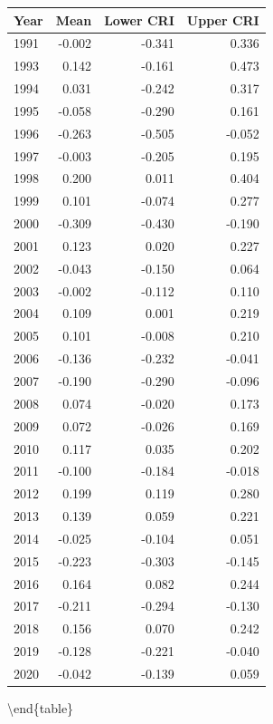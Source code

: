 \documentclass[]{book}
\begin{document}
\begin{tabular}[t]{l|r|r|r}
\hline
Year & Mean & Lower CRI & Upper CRI\\
\hline
1991 & -0.002 & -0.341 & 0.336\\
\hline
1993 & 0.142 & -0.161 & 0.473\\
\hline
1994 & 0.031 & -0.242 & 0.317\\
\hline
1995 & -0.058 & -0.290 & 0.161\\
\hline
1996 & -0.263 & -0.505 & -0.052\\
\hline
1997 & -0.003 & -0.205 & 0.195\\
\hline
1998 & 0.200 & 0.011 & 0.404\\
\hline
1999 & 0.101 & -0.074 & 0.277\\
\hline
2000 & -0.309 & -0.430 & -0.190\\
\hline
2001 & 0.123 & 0.020 & 0.227\\
\hline
2002 & -0.043 & -0.150 & 0.064\\
\hline
2003 & -0.002 & -0.112 & 0.110\\
\hline
2004 & 0.109 & 0.001 & 0.219\\
\hline
2005 & 0.101 & -0.008 & 0.210\\
\hline
2006 & -0.136 & -0.232 & -0.041\\
\hline
2007 & -0.190 & -0.290 & -0.096\\
\hline
2008 & 0.074 & -0.020 & 0.173\\
\hline
2009 & 0.072 & -0.026 & 0.169\\
\hline
2010 & 0.117 & 0.035 & 0.202\\
\hline
2011 & -0.100 & -0.184 & -0.018\\
\hline
2012 & 0.199 & 0.119 & 0.280\\
\hline
2013 & 0.139 & 0.059 & 0.221\\
\hline
2014 & -0.025 & -0.104 & 0.051\\
\hline
2015 & -0.223 & -0.303 & -0.145\\
\hline
2016 & 0.164 & 0.082 & 0.244\\
\hline
2017 & -0.211 & -0.294 & -0.130\\
\hline
2018 & 0.156 & 0.070 & 0.242\\
\hline
2019 & -0.128 & -0.221 & -0.040\\
\hline
2020 & -0.042 & -0.139 & 0.059\\
\hline
\end{tabular}

\textbackslash{}end\{table\}
\end{document}
